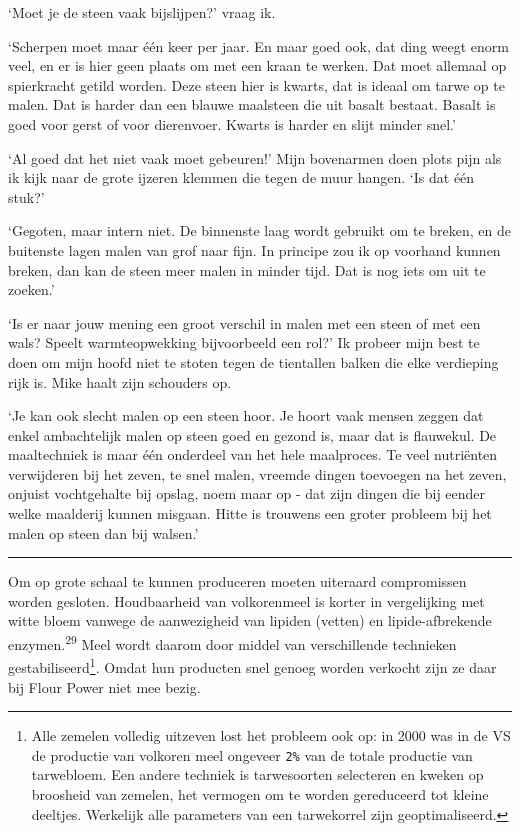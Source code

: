 \documentclass[
  11pt,
  dutch,
]{memoir}
\begin{document}
`Moet je de steen vaak bijslijpen?' vraag ik.

`Scherpen moet maar één keer per jaar. En maar goed ook, dat ding weegt
enorm veel, en er is hier geen plaats om met een kraan te werken. Dat
moet allemaal op spierkracht getild worden. Deze steen hier is kwarts,
dat is ideaal om tarwe op te malen. Dat is harder dan een blauwe
maalsteen die uit basalt bestaat. Basalt is goed voor gerst of voor
dierenvoer. Kwarts is harder en slijt minder snel.'

`Al goed dat het niet vaak moet gebeuren!' Mijn bovenarmen doen plots
pijn als ik kijk naar de grote ijzeren klemmen die tegen de muur hangen.
`Is dat één stuk?'

`Gegoten, maar intern niet. De binnenste laag wordt gebruikt om te
breken, en de buitenste lagen malen van grof naar fijn. In principe zou
ik op voorhand kunnen breken, dan kan de steen meer malen in minder
tijd. Dat is nog iets om uit te zoeken.'

`Is er naar jouw mening een groot verschil in malen met een steen of met
een wals? Speelt warmteopwekking bijvoorbeeld een rol?' Ik probeer mijn
best te doen om mijn hoofd niet te stoten tegen de tientallen balken die
elke verdieping rijk is. Mike haalt zijn schouders op.

`Je kan ook slecht malen op een steen hoor. Je hoort vaak mensen zeggen
dat enkel ambachtelijk malen op steen goed en gezond is, maar dat is
flauwekul. De maaltechniek is maar één onderdeel van het hele
maalproces. Te veel nutriënten verwijderen bij het zeven, te snel malen,
vreemde dingen toevoegen na het zeven, onjuist vochtgehalte bij opslag,
noem maar op - dat zijn dingen die bij eender welke maalderij kunnen
misgaan. Hitte is trouwens een groter probleem bij het malen op steen
dan bij walsen.'

\pfbreak

Om op grote schaal te kunnen produceren moeten uiteraard compromissen
worden gesloten. Houdbaarheid van volkorenmeel is korter in vergelijking
met witte bloem vanwege de aanwezigheid van lipiden (vetten) en
lipide-afbrekende enzymen.\textsuperscript{29} Meel wordt daarom door
middel van verschillende technieken gestabiliseerd\footnote{Alle zemelen
  volledig uitzeven lost het probleem ook op: in 2000 was in de VS de
  productie van volkoren meel ongeveer \texttt{2\%} van de totale
  productie van tarwebloem. Een andere techniek is tarwesoorten
  selecteren en kweken op broosheid van zemelen, het vermogen om te
  worden gereduceerd tot kleine deeltjes. Werkelijk alle parameters van
  een tarwekorrel zijn geoptimaliseerd.}. Omdat hun producten snel
genoeg worden verkocht zijn ze daar bij Flour Power niet mee bezig.
\end{document}
